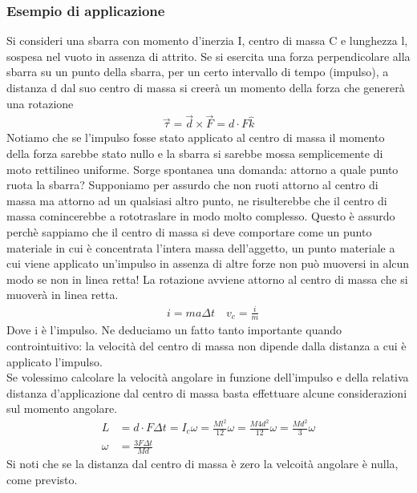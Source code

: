 \documentclass[10pt,a4paper]{article}
\begin{document}
\subsubsection{Esempio di applicazione}
Si consideri una sbarra con momento d'inerzia I, centro di massa C e lunghezza l, sospesa nel vuoto in assenza di attrito. Se si esercita una forza perpendicolare alla sbarra su un punto della sbarra, per un certo intervallo di tempo (impulso), a distanza d dal suo centro di massa si creerà un momento della forza che genererà una rotazione
\begin{align*}
	\vec{\tau} = \vec{d}\times\vec{F} = d \cdot F \hat{k}
\end{align*} 
Notiamo che se l'impulso fosse stato applicato al centro di massa il momento della forza sarebbe stato nullo e la sbarra si sarebbe mossa semplicemente di moto rettilineo uniforme. Sorge spontanea una domanda: attorno a quale punto ruota la sbarra? Supponiamo per assurdo che non ruoti attorno al centro di massa ma attorno ad un qualsiasi altro punto, ne risulterebbe che il centro di massa comincerebbe a rototraslare in modo molto complesso. Questo è assurdo perchè sappiamo che il centro di massa si deve comportare come un punto materiale in cui è concentrata l'intera massa dell'aggetto, un punto materiale a cui viene applicato un'impulso in assenza di altre forze non può muoversi in alcun modo se non in linea retta! La rotazione avviene attorno al centro di massa che si muoverà in linea retta.
\begin{align*}
	&i = m a \Delta t \quad v_c = \frac{i}{m}
\end{align*} 
Dove i è l'impulso. Ne deduciamo un fatto tanto importante quando controintuitivo: la velocità del centro di massa non dipende dalla distanza a cui è applicato l'impulso.\\
Se volessimo calcolare la velocità angolare in funzione dell'impulso e della relativa distanza d'applicazione dal centro di massa basta effettuare alcune considerazioni sul momento angolare.  
\begin{align*}
	L &= d \cdot F \Delta t = I_c \omega = \frac{M l^2}{12} \omega= \frac{M4d^2}{12}\omega= \frac{M d^2}{3}\omega\\
	\omega &= \frac{3 F \Delta t}{M d}
\end{align*}
Si noti che se la distanza dal centro di massa è zero la velcoità angolare è nulla, come previsto. 
\end{document}
